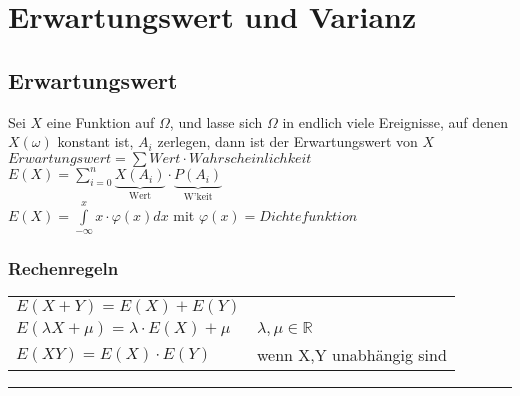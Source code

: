 \section{Erwartungswert und Varianz}

	\subsection{Erwartungswert  }
		Sei $X$ eine Funktion auf $\Omega$, und lasse sich $\Omega$ in endlich viele
		Ereignisse, auf denen $X(\omega)$ konstant ist, $A_i$ zerlegen, dann ist der
		Erwartungswert von $X$\\
        \hspace*{5.7cm}$Erwartungswert = \sum Wert \cdot Wahrscheinlichkeit$\\
		\hspace*{7.5cm}$E(X)=\sum\limits_{i=0}^n
		\underbrace{X(A_i)}_{\text{Wert}}\cdot \underbrace{P(A_i)}_{\text{W'keit}}$\\
		\hspace*{5.7cm}$E(X) = \int\limits_{-\infty}^x x \cdot \varphi(x) dx$ mit
		$\varphi(x) = Dichtefunktion$ 

		\subsubsection{Rechenregeln}
			\begin{tabular}{ll}
    		$E(X+Y)=E(X)+E(Y)$\\
    		$E(\lambda X + \mu)=\lambda \cdot E(X) + \mu$ & $\lambda, \mu \in \mathbb{R}$\\
    		$E(XY) = E(X)\cdot E(Y)$ & wenn X,Y unabhängig sind\\
    		\end{tabular}

\vspace{1mm}
\hrule
\vspace{2mm}


